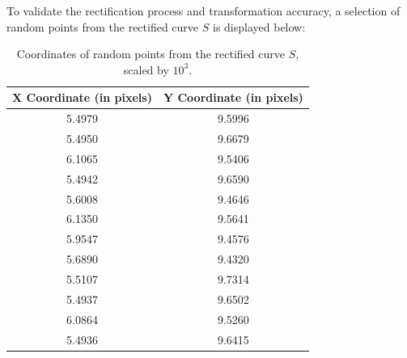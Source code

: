 To validate the rectification process and transformation accuracy, a selection of random points from the rectified curve $S$ is displayed below:

\begin{table}[h!]
\centering
\begin{tabular}{@{}c c@{}}
\toprule
\textbf{X Coordinate (in pixels)} & \textbf{Y Coordinate (in pixels)} \\ \midrule
5.4979 & 9.5996 \\
5.4950 & 9.6679 \\
6.1065 & 9.5406 \\
5.4942 & 9.6590 \\
5.6008 & 9.4646 \\
6.1350 & 9.5641 \\
5.9547 & 9.4576 \\
5.6890 & 9.4320 \\
5.5107 & 9.7314 \\
5.4937 & 9.6502 \\
6.0864 & 9.5260 \\
5.4936 & 9.6415 \\ \bottomrule
\end{tabular}
\caption{Coordinates of random points from the rectified curve \( S \), scaled by \( 10^3 \).}
\end{table}
